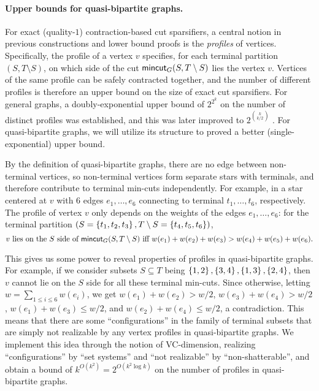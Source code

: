 \paragraph{Upper bounds for quasi-bipartite graphs.}
For exact (quality-$1$) contraction-based cut sparsifiers, a central notion in previous constructions and lower bound proofs is the \emph{profiles} of vertices. Specifically, the profile of a vertex $v$ specifies, for each terminal partition $(S,T\setminus S)$, on which side of the cut $\mathsf{mincut}_G(S,T\setminus S)$ lies the vertex $v$.
Vertices of the same profile can be safely contracted together, and the number of different profiles is therefore an upper bound on the size of exact cut sparsifiers. For general graphs, a doubly-exponential upper bound of $2^{2^k}$ \cite{hagerup1998characterizing} on the number of distinct profiles was established, and this was later improved to $2^{\binom{k}{k/2}}$ \cite{khan2014mimicking}. For quasi-bipartite graphs, we will utilize its structure to proved a better (single-exponential) upper bound.

By the definition of quasi-bipartite graphs, there are no edge between non-terminal vertices, so non-terminal vertices form separate stars with terminals, and therefore contribute to terminal min-cuts independently. For example, in a star centered at $v$ with $6$ edges $e_1,\ldots,e_6$ connecting to terminal $t_1,\ldots,t_6$, respectively. The profile of vertex $v$ only depends on the weights of the edges $e_1,\ldots,e_6$: for the terminal partition $(S=\left\{ t_1,t_2,t_3 \right\},T\setminus S=\left\{ t_4,t_5,t_6 \right\})$, $$\text{$v$ lies on the $S$ side of $\mathsf{mincut}_G(S,T\setminus S)$ iff } w(e_1)+w(e_2)+w(e_3)>w(e_4)+w(e_5)+w(e_6).$$

This gives us some power to reveal properties of profiles in quasi-bipartite graphs.
For example, if we consider subsets $S\subseteq T$ being $\left\{ 1,2 \right\},\left\{ 3,4 \right\},\left\{ 1,3 \right\},\left\{ 2,4 \right\}$, then $v$ cannot lie on the $S$ side for all these terminal min-cuts. Since otherwise, letting $w=\sum_{1\le  i\le 6}w(e_i)$, we get $w(e_1)+w(e_2)>w/2$, $w(e_3)+w(e_4)>w/2$, $w(e_1)+w(e_3)\le w/2$, and $w(e_2)+w(e_4)\le w/2$, a contradiction. This means that there are some ``configurations'' in the family of terminal subsets that are simply not realizable by any vertex profiles in quasi-bipartite graphs. We implement this idea through the notion of VC-dimension, realizing ``configurations'' by ``set systems'' and ``not realizable'' by ``non-shatterable'', and obtain a bound of $k^{O(k^2)}=2^{O(k^2\log k)}$ on the number of  profiles in quasi-bipartite graphs.


